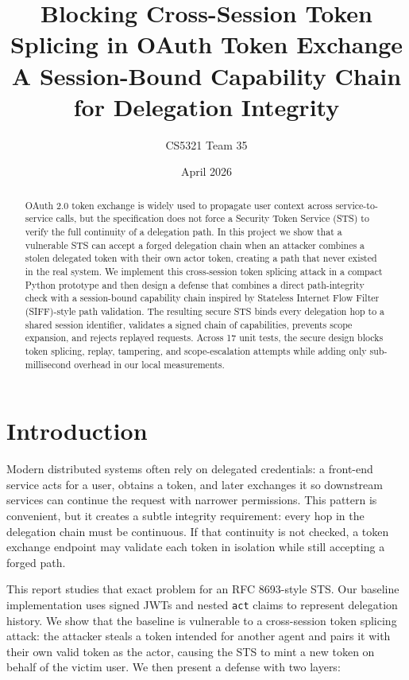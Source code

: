 \documentclass[11pt]{article}
\title{Blocking Cross-Session Token Splicing in OAuth Token Exchange\\
\large A Session-Bound Capability Chain for Delegation Integrity}
\author{CS5321 Team 35}
\date{April 2026}
\begin{document}
\maketitle

\begin{abstract}
OAuth 2.0 token exchange is widely used to propagate user context across service-to-service calls, but the specification does not force a Security Token Service (STS) to verify the full continuity of a delegation path. In this project we show that a vulnerable STS can accept a forged delegation chain when an attacker combines a stolen delegated token with their own actor token, creating a path that never existed in the real system. We implement this cross-session token splicing attack in a compact Python prototype and then design a defense that combines a direct path-integrity check with a session-bound capability chain inspired by Stateless Internet Flow Filter (SIFF)-style path validation. The resulting secure STS binds every delegation hop to a shared session identifier, validates a signed chain of capabilities, prevents scope expansion, and rejects replayed requests. Across 17 unit tests, the secure design blocks token splicing, replay, tampering, and scope-escalation attempts while adding only sub-millisecond overhead in our local measurements.
\end{abstract}

\section{Introduction}
Modern distributed systems often rely on delegated credentials: a front-end service acts for a user, obtains a token, and later exchanges it so downstream services can continue the request with narrower permissions. This pattern is convenient, but it creates a subtle integrity requirement: every hop in the delegation chain must be continuous. If that continuity is not checked, a token exchange endpoint may validate each token in isolation while still accepting a forged path.

This report studies that exact problem for an RFC 8693-style STS. Our baseline implementation uses signed JWTs and nested \texttt{act} claims to represent delegation history. We show that the baseline is vulnerable to a cross-session token splicing attack: the attacker steals a token intended for another agent and pairs it with their own valid token as the actor, causing the STS to mint a new token on behalf of the victim user. We then present a defense with two layers:
\end{document}
